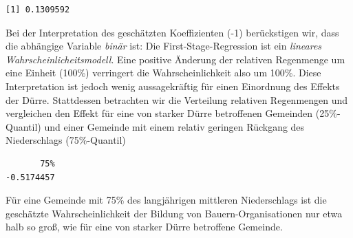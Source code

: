 \documentclass[
  a4paper,
  DIV=11,
  oneside]{scrreprt}
\newenvironment{Shaded}{\begin{snugshade}}{\end{snugshade}}
\newcommand{\AttributeTok}[1]{\textcolor[rgb]{0.40,0.45,0.13}{#1}}
\newcommand{\CommentTok}[1]{\textcolor[rgb]{0.37,0.37,0.37}{#1}}
\newcommand{\DecValTok}[1]{\textcolor[rgb]{0.68,0.00,0.00}{#1}}
\newcommand{\FunctionTok}[1]{\textcolor[rgb]{0.28,0.35,0.67}{#1}}
\newcommand{\NormalTok}[1]{\textcolor[rgb]{0.00,0.23,0.31}{#1}}
\newcommand{\SpecialCharTok}[1]{\textcolor[rgb]{0.37,0.37,0.37}{#1}}
\begin{document}
\begin{Shaded}
\end{Shaded}

\begin{verbatim}
[1] 0.1309592
\end{verbatim}

Bei der Interpretation des geschätzten Koeffizienten (-1) berückstigen
wir, dass die abhängige Variable \emph{binär} ist: Die
First-Stage-Regression ist ein \emph{lineares Wahrscheinlicheitsmodell}.
Eine positive Änderung der relativen Regenmenge um eine Einheit (100\%)
verringert die Wahrscheinlichkeit also um 100\%. Diese Interpretation
ist jedoch wenig aussagekräftig für einen Einordnung des Effekts der
Dürre. Stattdessen betrachten wir die Verteilung relativen Regenmengen
und vergleichen den Effekt für eine von starker Dürre betroffenen
Gemeinden (25\%-Quantil) und einer Gemeinde mit einem relativ geringen
Rückgang des Niederschlags (75\%-Quantil)

\begin{Shaded}
\end{Shaded}

\begin{verbatim}
       75% 
-0.5174457 
\end{verbatim}

Für eine Gemeinde mit 75\% des langjährigen mittleren Niederschlags ist
die geschätzte Wahrscheinlichkeit der Bildung von Bauern-Organisationen
nur etwa halb so groß, wie für eine von starker Dürre betroffene
Gemeinde.
\end{document}
